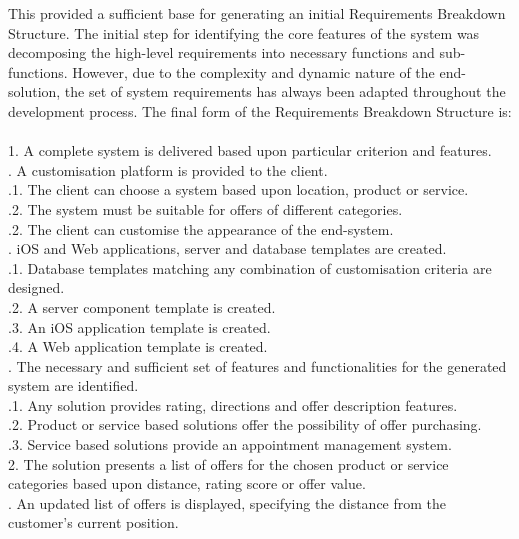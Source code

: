 This provided a sufficient base for generating an initial Requirements Breakdown Structure. The initial step for identifying the core features of the system was decomposing the high-level requirements into necessary functions and sub-functions. However, due to the complexity and dynamic nature of the end-solution, the set of system requirements has always been adapted throughout the development process. The final form of the Requirements Breakdown Structure is:\\\\
1. A complete system is delivered based upon particular criterion and features.\\
. A customisation platform is provided to the client.\\
\indent{}.1. The client can choose a system based upon location, product or service.\\
\indent{}.2. The system must be suitable for offers of different categories.\\
\indent{}.2. The client can customise the appearance of the end-system.\\
. iOS and Web applications, server and database templates are created.\\
\indent{}.1. Database templates matching any combination of customisation criteria are designed.\\
\indent{}.2. A server component template is created.\\
\indent{}.3. An iOS application template is created.\\
\indent{}.4. A Web application template is created.\\
. The necessary and sufficient set of features and functionalities for the generated system are identified.\\
\indent{}.1. Any solution provides rating, directions and offer description features.\\
\indent{}.2. Product or service based solutions offer the possibility of offer purchasing.\\
\indent{}.3. Service based solutions provide an appointment management system.\\
2. The solution presents a list of offers for the chosen product or service categories based upon distance, rating score or offer value.\\
. An updated list of offers is displayed, specifying the distance from the customer's current position.\\
